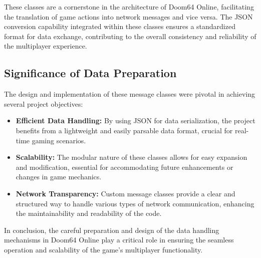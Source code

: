 These classes are a cornerstone in the architecture of Doom64 Online, facilitating the translation of game actions into network messages and vice versa. The JSON conversion capability integrated within these classes ensures a standardized format for data exchange, contributing to the overall consistency and reliability of the multiplayer experience.

\subsection{Significance of Data Preparation}
The design and implementation of these message classes were pivotal in achieving several project objectives:
\begin{itemize}
\item \textbf{Efficient Data Handling:} By using JSON for data serialization, the project benefits from a lightweight and easily parsable data format, crucial for real-time gaming scenarios.
\item \textbf{Scalability:} The modular nature of these classes allows for easy expansion and modification, essential for accommodating future enhancements or changes in game mechanics.
\item \textbf{Network Transparency:} Custom message classes provide a clear and structured way to handle various types of network communication, enhancing the maintainability and readability of the code.
\end{itemize}

In conclusion, the careful preparation and design of the data handling mechanisms in Doom64 Online play a critical role in ensuring the seamless operation and scalability of the game's multiplayer functionality.







